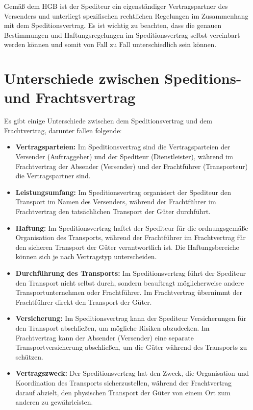     Gemäß dem HGB ist der Spediteur ein eigenständiger Vertragspartner des Versenders und unterliegt spezifischen rechtlichen Regelungen im Zusammenhang mit dem Speditionsvertrag. 
    Es ist wichtig zu beachten, dass die genauen Bestimmungen und Haftungsregelungen im Speditionsvertrag selbst vereinbart werden können und somit von Fall zu Fall unterschiedlich sein können.
    
    \section{Unterschiede zwischen Speditions- und Frachtsvertrag}
    Es gibt einige Unterschiede zwischen dem Speditionsvertrag und dem Frachtvertrag, darunter fallen folgende:\nl

    \begin{itemize}
        \item \textbf{Vertragsparteien:} Im Speditionsvertrag sind die Vertragsparteien der Versender (Auftraggeber) und der Spediteur (Dienstleister), während im Frachtvertrag der Absender (Versender) und der Frachtführer (Transporteur) die Vertragspartner sind.
        \item \textbf{Leistungsumfang:} Im Speditionsvertrag organisiert der Spediteur den Transport im Namen des Versenders, während der Frachtführer im Frachtvertrag den tatsächlichen Transport der Güter durchführt.
        \item \textbf{Haftung:} Im Speditionsvertrag haftet der Spediteur für die ordnungsgemäße Organisation des Transports, während der Frachtführer im Frachtvertrag für den sicheren Transport der Güter verantwortlich ist. Die Haftungsbereiche können sich je nach Vertragstyp unterscheiden.
        \item \textbf{Durchführung des Transports:} Im Speditionsvertrag führt der Spediteur den Transport nicht selbst durch, sondern beauftragt möglicherweise andere Transportunternehmen oder Frachtführer. Im Frachtvertrag übernimmt der Frachtführer direkt den Transport der Güter.
        \item \textbf{Versicherung:} Im Speditionsvertrag kann der Spediteur Versicherungen für den Transport abschließen, um mögliche Risiken abzudecken. Im Frachtvertrag kann der Absender (Versender) eine separate Transportversicherung abschließen, um die Güter während des Transports zu schützen.
        \item \textbf{Vertragszweck:} Der Speditionsvertrag hat den Zweck, die Organisation und Koordination des Transports sicherzustellen, während der Frachtvertrag darauf abzielt, den physischen Transport der Güter von einem Ort zum anderen zu gewährleisten.
    \end{itemize}

